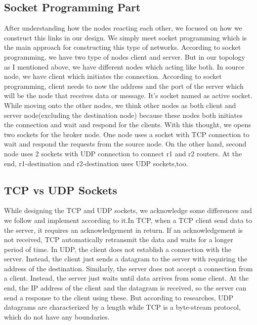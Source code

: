 \documentclass[conference]{IEEEtran}
\begin{document}
\subsection{Socket Programming Part}

After understanding how the nodes reacting each other, we focused on how we construct this links in our design. We simply meet socket programming which is the main approach for constructing this type of networks. According to socket programming, we have two type of nodes client and server. But in our topology as I mentioned above, we have different nodes which acting like both. In source node, we have client which initiates the connection. According to socket programming, client needs to now the address and the port of the server which will be the node that receives data or message. It's socket named as active socket. While moving onto the other nodes, we think other nodes as both client and server node(excluding the destination node) because these nodes both initiates the connection and wait  and respond for the clients. With this thought, we opens two sockets for the broker node. One node uses a socket with TCP connection to wait and respond the requests from the source node. On the other hand, second node uses 2 sockets with UDP connection to connect r1 and r2 routers. At the end, r1-destination and r2-destination uses UDP sockets,too.

\subsection{TCP vs UDP Sockets}
While designing the TCP and UDP sockets, we acknowledge some differences and we follow and implement according to it.In TCP, when a TCP client send data to the server, it requires an acknowledgement in return. If an acknowledgement is not received, TCP automatically retransmit the data and waits for a longer period of time. In UDP, the client does not establish a connection with the server. Instead, the client just sends a datagram to the server with requiring the address of the destination. Similarly, the server does not accept a connection from a client. Instead, the server just waits until data arrives from some client. At the end, the IP address of the client and the datagram is received, so the server can send a response to the client using these. But according to researches, UDP datagrams are characterized by a length while TCP is a byte-stream protocol, which do not have any boundaries. 
\end{document}
